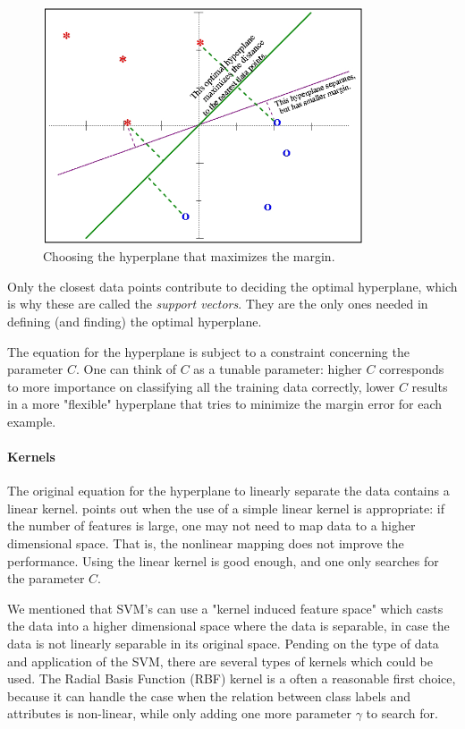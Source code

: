 \documentclass[runningheads,a4paper]{llncs}
\begin{document}
\begin{figure}[h]
\centering
\includegraphics[height=7cm]{fig/SVM_hyperplane.png}
\caption{Choosing the hyperplane that maximizes the margin.}
\label{fig:hyperplane}
\end{figure}

Only the closest data points contribute to deciding the optimal hyperplane, which is why these are called the \textit{support vectors}. They are the only ones needed in defining (and finding) the optimal hyperplane. 

The equation for the hyperplane is subject to a constraint concerning the parameter $C$. 
One can think of $C$ as a tunable parameter: higher $C$ corresponds to more importance on classifying all the training data correctly, lower $C$ results in a more "flexible" hyperplane that tries to minimize the margin error for each example.

\paragraph{Kernels} The original equation for the hyperplane to linearly separate the data contains a linear kernel. \cite{Hsu2016} points out when the use of a simple linear kernel is appropriate:
if the number of features is large, one may not need to map data to a higher dimensional space. That is, the nonlinear mapping does not improve the performance. Using the linear kernel is good enough, and one only searches for the parameter $C$.

We mentioned that SVM's can use a "kernel induced feature space" which casts the data into a higher dimensional space where the data is separable, in case the data is not linearly separable in its original space. Pending on the type of data and application of the SVM, there are several types of kernels which could be used. The Radial Basis Function (RBF) kernel is a often a reasonable first choice, because it can handle the case when the relation between class labels and attributes is non-linear, while only adding one more parameter $\gamma$ to search for.
\end{document}
